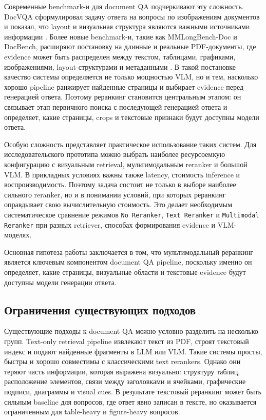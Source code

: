\documentclass[conference]{IEEEtran}
\begin{document}
Современные benchmark-и для document QA подчеркивают эту сложность. DocVQA сформулировал задачу ответа на вопросы по изображениям документов и показал, что layout и визуальная структура являются важными источниками информации \cite{docvqa2020}. Более новые benchmark-и, такие как MMLongBench-Doc и DocBench, расширяют постановку на длинные и реальные PDF-документы, где evidence может быть распределен между текстом, таблицами, графиками, изображениями, layout-структурами и метаданными \cite{mmlongbenchdoc2024,docbench2024}. В такой постановке качество системы определяется не только мощностью VLM, но и тем, насколько хорошо pipeline ранжирует найденные страницы и выбирает evidence перед генерацией ответа. Поэтому реранкинг становится центральным этапом: он связывает этап первичного поиска с последующей генерацией ответа и определяет, какие страницы, crops и текстовые признаки будут доступны модели ответа.

Особую сложность представляет практическое использование таких систем. Для исследовательского прототипа можно выбрать наиболее ресурсоемкую конфигурацию с визуальным retrieval, мультимодальным reranker и большой VLM. В прикладных условиях важны также latency, стоимость inference и воспроизводимость. Поэтому задача состоит не только в выборе наиболее сильного reranker, но и в понимании условий, при которых реранкинг оправдывает свою вычислительную стоимость. Это делает необходимым систематическое сравнение режимов \texttt{No Reranker}, \texttt{Text Reranker} и \texttt{Multimodal Reranker} при разных retriever, способах формирования evidence и VLM-моделях.

Основная гипотеза работы заключается в том, что мультимодальный реранкинг является ключевым компонентом document QA pipeline, поскольку именно он определяет, какие страницы, визуальные области и текстовые evidence будут доступны модели генерации ответа.

\subsection{Ограничения существующих подходов}

Существующие подходы к document QA можно условно разделить на несколько групп. Text-only retrieval pipeline извлекают текст из PDF, строят текстовый индекс и подают найденные фрагменты в LLM или VLM. Такие системы просты, быстры и хорошо совместимы с классическими text rerankers. Однако они теряют часть информации, которая выражена визуально: структуру таблиц, расположение элементов, связи между заголовками и ячейками, графические подписи, диаграммы и visual cues. В результате текстовый реранкинг может быть сильным baseline для вопросов, где ответ явно записан в тексте, но оказывается ограниченным для table-heavy и figure-heavy вопросов.
\end{document}
